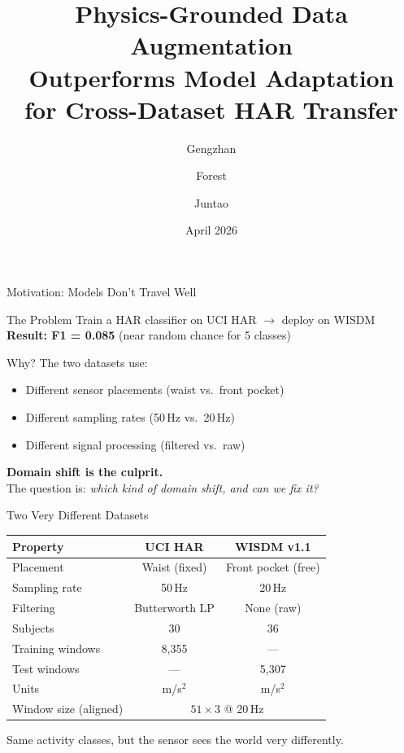 \documentclass{beamer}
\title[Cross-Dataset HAR Transfer]{Physics-Grounded Data Augmentation\\Outperforms Model Adaptation\\for Cross-Dataset HAR Transfer}
\author{Gengzhan \and Forest \and Juntao}
\institute{University of Pennsylvania}
\date{April 2026}
\begin{document}
\begin{frame}
\titlepage
\end{frame}

\begin{frame}{Motivation: Models Don't Travel Well}

\begin{block}{The Problem}
Train a HAR classifier on UCI HAR $\rightarrow$ deploy on WISDM \\
\medskip
\textbf{Result: F1 = 0.085} (near random chance for 5 classes)
\end{block}

\bigskip
Why? The two datasets use:
\begin{itemize}
    \item Different sensor placements (waist vs.\ front pocket)
    \item Different sampling rates (50\,Hz vs.\ 20\,Hz)
    \item Different signal processing (filtered vs.\ raw)
\end{itemize}

\bigskip
\textbf{Domain shift is the culprit.}\\
The question is: \emph{which kind of domain shift, and can we fix it?}

\end{frame}

\begin{frame}{Two Very Different Datasets}

\begin{table}
\centering
\begin{tabular}{lcc}
\toprule
Property & UCI HAR & WISDM v1.1 \\
\midrule
Placement & Waist (fixed) & Front pocket (free) \\
Sampling rate & 50\,Hz & 20\,Hz \\
Filtering & Butterworth LP & None (raw) \\
Subjects & 30 & 36 \\
Training windows & 8,355 & --- \\
Test windows & --- & 5,307 \\
Units & m/s$^2$ & m/s$^2$ \\
Window size (aligned) & \multicolumn{2}{c}{$51 \times 3$ @ 20\,Hz} \\
\bottomrule
\end{tabular}
\end{table}

\bigskip
Same activity classes, but the sensor sees the world very differently.

\end{frame}
\end{document}
